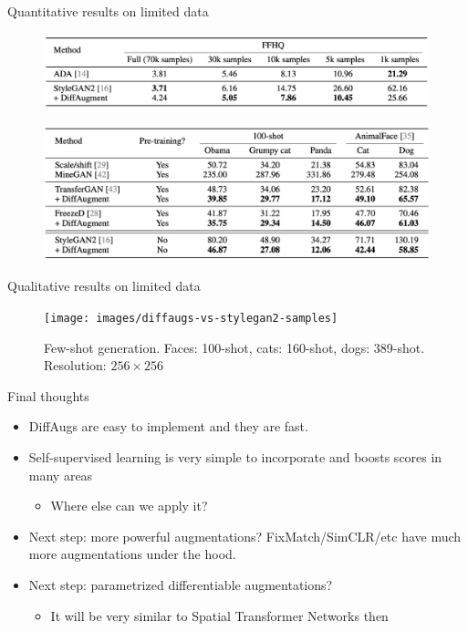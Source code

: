 \documentclass[handout, 10pt]{beamer}
\begin{document}
\begin{frame}{Quantitative results on limited data}
\begin{figure}
\centering
\includegraphics[width=\textwidth]{images/diffaug-vs-stylegan2-limited-data-results}
\end{figure}
\begin{figure}
\centering
\includegraphics[width=\textwidth]{images/diffaug-vs-pretrained-models-limited-data-results}
\end{figure}
\end{frame}


\begin{frame}{Qualitative results on limited data}
\begin{figure}
\centering
\texttt{[image: images/diffaugs-vs-stylegan2-samples]}
\caption{Few-shot generation. Faces: 100-shot, cats: 160-shot, dogs: 389-shot. Resolution: $256 \times 256$}
\end{figure}
\end{frame}


\begin{frame}{Final thoughts}
\begin{itemize}
    \item\pause DiffAugs are easy to implement and they are fast.
    \item\pause Self-supervised learning is very simple to incorporate and boosts scores in many areas
    \begin{itemize}
        \item\pause Where else can we apply it?
    \end{itemize}
    \item\pause Next step: more powerful augmentations? FixMatch/SimCLR/etc have much more augmentations under the hood.
    \item\pause Next step: parametrized differentiable augmentations?
    \begin{itemize}
        \item\pause It will be very similar to Spatial Transformer Networks then
    \end{itemize}
\end{itemize}
\end{frame}
\end{document}
